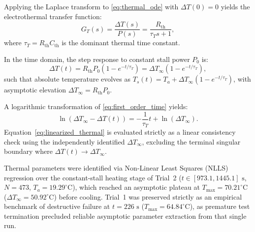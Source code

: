\documentclass[lettersize,journal]{IEEEtran}
\begin{document}
	Applying the Laplace transform to \eqref{eq:thermal_ode} with $\Delta T(0) = 0$ yields the electrothermal transfer function:
	\begin{equation}
		G_T(s) = \frac{\Delta T(s)}{P(s)} = \frac{R_{\text{th}}}{\tau_T s + 1},
		\label{eq:transfer_function}
	\end{equation}
	where $\tau_T = R_{\text{th}}C_{\text{th}}$ is the dominant thermal time constant.
	
	In the time domain, the step response to constant stall power $P_0$ is:
	\begin{equation}
		\Delta T(t) = R_{\text{th}}P_0\left(1 - e^{-t/\tau_T}\right) = \Delta T_\infty\left(1 - e^{-t/\tau_T}\right),
		\label{eq:first_order_time}
	\end{equation}
	such that absolute temperature evolves as $T_s(t) = T_a + \Delta T_\infty(1 - e^{-t/\tau_T})$, with asymptotic elevation $\Delta T_\infty = R_{\text{th}}P_0$.
	
	A logarithmic transformation of \eqref{eq:first_order_time} yields:
	\begin{equation}
		\ln\left(\Delta T_\infty - \Delta T(t)\right) = -\frac{1}{\tau_T}t + \ln(\Delta T_\infty).
		\label{eq:linearized_thermal}
	\end{equation}
	Equation~\eqref{eq:linearized_thermal} is evaluated strictly as a linear consistency check using the independently identified $\Delta T_\infty$, excluding the terminal singular boundary where $\Delta T(t) \to \Delta T_\infty$.
	
	Thermal parameters were identified via Non-Linear Least Squares (NLLS) regression over the constant-stall heating stage of Trial~2 ($t \in [973.1, 1445.1]\text{ s}$, $N = 473$, $T_a = 19.29^\circ\text{C}$), which reached an asymptotic plateau at $T_{\max} = 70.21^\circ\text{C}$ ($\Delta T_\infty = 50.92^\circ\text{C}$) before cooling. Trial~1 was preserved strictly as an empirical benchmark of destructive failure at $t = 226\text{ s}$ ($T_{\max} = 64.84^\circ\text{C}$), as premature test termination precluded reliable asymptotic parameter extraction from that single run.
	
\end{document}
